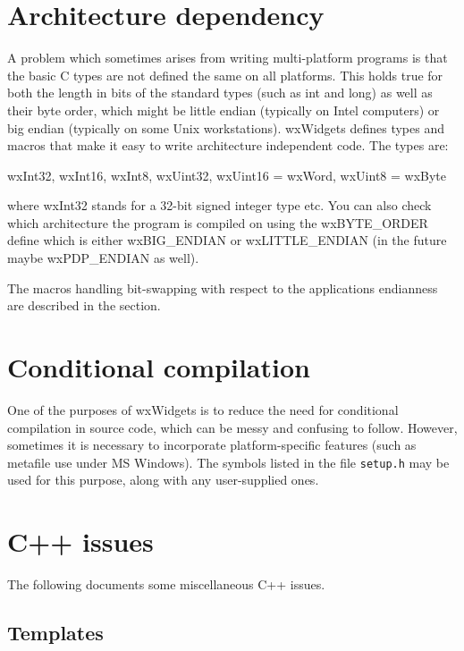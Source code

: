 \section{Architecture dependency}\label{architecturedependency}

A problem which sometimes arises from writing multi-platform programs is that
the basic C types are not defined the same on all platforms. This holds true
for both the length in bits of the standard types (such as int and long) as 
well as their byte order, which might be little endian (typically
on Intel computers) or big endian (typically on some Unix workstations). wxWidgets
defines types and macros that make it easy to write architecture independent
code. The types are:

wxInt32, wxInt16, wxInt8, wxUint32, wxUint16 = wxWord, wxUint8 = wxByte

where wxInt32 stands for a 32-bit signed integer type etc. You can also check
which architecture the program is compiled on using the wxBYTE\_ORDER define
which is either wxBIG\_ENDIAN or wxLITTLE\_ENDIAN (in the future maybe wxPDP\_ENDIAN
as well).

The macros handling bit-swapping with respect to the applications endianness
are described in the  section.

\section{Conditional compilation}\label{conditionalcompilation}

One of the purposes of wxWidgets is to reduce the need for conditional
compilation in source code, which can be messy and confusing to follow.
However, sometimes it is necessary to incorporate platform-specific
features (such as metafile use under MS Windows). The  
symbols listed in the file {\tt setup.h} may be used for this purpose,
along with any user-supplied ones.

\section{C++ issues}\label{cpp}

The following documents some miscellaneous C++ issues.

\subsection{Templates}\label{templates}


